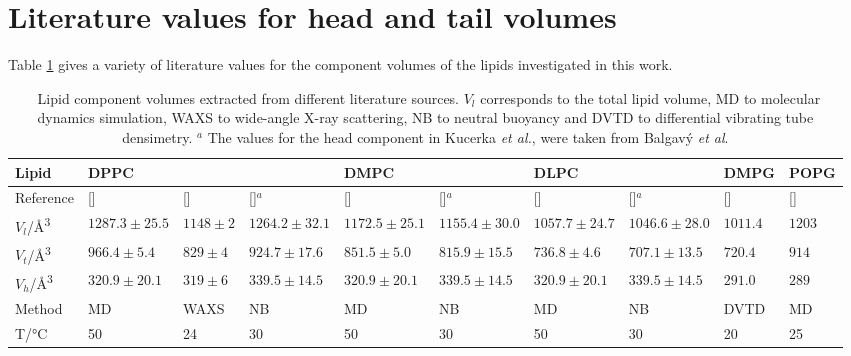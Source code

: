 \documentclass[11pt,a4paper]{article}
\begin{document}
\section{Literature values for head and tail volumes}
Table \ref{tab:water} gives a variety of literature values for the component volumes of the lipids investigated in this work.
\begin{table}
  \centering
	\caption{\ Lipid component volumes extracted from different literature sources. $V_l$ corresponds to the total lipid volume, MD to molecular dynamics simulation, WAXS to wide-angle X-ray scattering, NB to neutral buoyancy and DVTD to differential vibrating tube densimetry. $^a$ The values for the head component in Kucerka \emph{et al.},\cite{Kucerka2004} were taken from Balgav\'{y} \emph{et al}.\cite{Balgavy2001}}
  \centering
	\label{tab:water}
	\begin{tabular}{l|lll|ll|ll|l|l}
    Lipid & DPPC & & & DMPC & & DLPC & & DMPG & POPG \\
    \hline
    Reference & [\cite{Armen1998}] & [\cite{Sun1994}] & [\cite{Kucerka2004,Balgavy2001}]$^a$ & [\cite{Armen1998}] & [\cite{Kucerka2004,Balgavy2001}]$^a$ & [\cite{Armen1998}] & [\cite{Kucerka2004,Balgavy2001}]$^a$ & [\cite{Pan2012}] & [\cite{Kucerka2012}] \\
    \hline
    $V_l$/\si{\angstrom^3} & $1287.3\pm25.5$ & $1148\pm2$ & $1264.2\pm32.1$ & $1172.5\pm25.1$ & $1155.4\pm30.0$ & $1057.7\pm24.7$ & $1046.6\pm28.0$ & $1011.4$ & $1203$ \\
    $V_t$/\si{\angstrom^3} & $966.4\pm5.4$ & $829\pm4$ & $924.7\pm17.6$ & $851.5\pm5.0$ & $815.9\pm15.5$ & $736.8\pm4.6$ & $707.1\pm13.5$ & $720.4$ & $914$ \\
    $V_h$/\si{\angstrom^3} & $320.9\pm20.1$ & $319\pm6$ & $339.5\pm14.5$ & $320.9\pm20.1$ & $339.5\pm14.5$ & $320.9\pm20.1$ & $339.5\pm14.5$ & $291.0$ & $289$ \\
    Method & MD & WAXS & NB & MD & NB & MD & NB & DVTD & MD \\
    T/\si{\celsius} & 50 & 24 & 30 & 50 & 30 & 50 & 30 & 20 & 25 \\
	\end{tabular}
\end{table}
\end{document}
